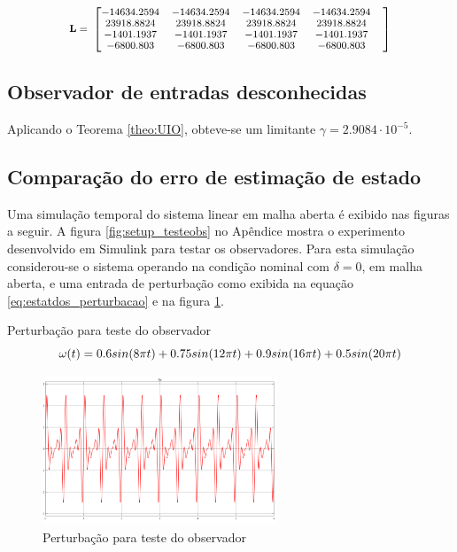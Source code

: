 \begin{equation} \label{eq:ganhos_pred} \small
    \begin{split}
        \mathbf{L}=\
    \end{split}
    \begin{bmatrix}
       -14634.2594& -14634.2594& -14634.2594& -14634.2594&\\
        23918.8824&  23918.8824&  23918.8824&  23918.8824&\\
        -1401.1937&  -1401.1937&  -1401.1937&  -1401.1937&\\
        -6800.803 &  -6800.803 &  -6800.803 &  -6800.803 &\\
    \end{bmatrix}
\end{equation}

\subsection{Observador de entradas desconhecidas}
Aplicando o Teorema \ref{theo:UIO}, obteve-se um limitante $\gamma=2.9084\cdot10^{-5}$. 

\subsection{Comparação do erro de estimação de estado}

Uma simulação temporal do sistema linear em malha aberta é exibido nas figuras a seguir. A figura \ref{fig:setup_testeobs} no Apêndice mostra o experimento desenvolvido em Simulink para testar os observadores.
Para esta simulação considerou-se o sistema operando na condição nominal com $\delta=0$, em malha aberta, e uma entrada de perturbação como exibida na equação \eqref{eq:estatdos_perturbacao} e na figura \ref{fig:estatdos_perturbacao}.

 Perturbação para teste do observador
\begin{equation}\label{eq:estatdos_perturbacao}  \footnotesize
    \omega(t)=0.6sin(8\pi t)+0.75sin(12\pi t)+0.9sin(16\pi t)+0.5sin(20\pi t)
\end{equation}

\begin{figure}[htbp]
    \begin{centering}
    \includegraphics[width=7cm]{img/estatdos_perturbacao.png} 
    \caption{Perturbação para teste do observador}
    \label{fig:estatdos_perturbacao}
    \end{centering}
\end{figure}


